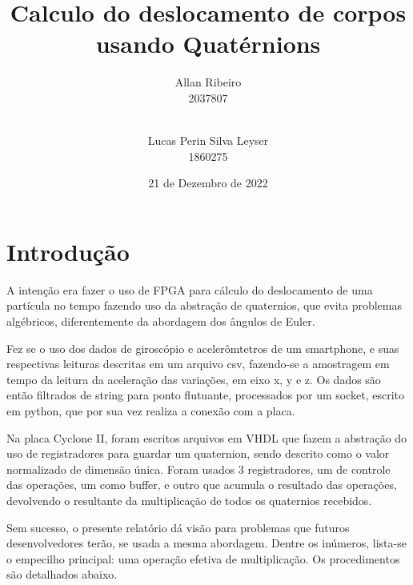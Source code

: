 \documentclass [12pt,oneside] {article}
\begin{document}

\title {Calculo do deslocamento de corpos usando Quatérnions}

\author {
	Allan Ribeiro\\
	2037807\\
	\and\\
	Lucas Perin Silva Leyser\\
	1860275
}

\date {21 de Dezembro de 2022}

\maketitle



\section{Introdução}


	A intenção era fazer o uso de FPGA para cálculo do
deslocamento de uma partícula no tempo fazendo uso da abstração de
quaternios, que evita problemas algébricos, diferentemente da
abordagem dos ângulos de Euler.

	Fez se o uso dos dados de giroscópio e acelerômtetros de um
smartphone, e suas respectivas leituras descritas em um arquivo csv, 
fazendo-se a amostragem em tempo da leitura da aceleração das variações, 
em eixo x, y e z. Os dados são então filtrados de string para ponto flutuante, 
processados por um socket, escrito em python, que por sua vez realiza 
a conexão com a placa.

	Na placa Cyclone II, foram escritos arquivos em VHDL que fazem
a abstração do uso de registradores para guardar um quaternion, sendo
descrito como o valor normalizado de dimensão única. Foram usados 3
registradores, um de controle das operações, um como buffer, e outro que acumula o resultado das operações, devolvendo o resultante da multiplicação de todos os quaternios recebidos.

	Sem sucesso, o presente relatório dá visão para problemas que
futuros desenvolvedores terão, se usada a mesma abordagem. Dentre os
inúmeros, lista-se o empecilho principal: uma operação efetiva de
multiplicação. Os procedimentos são detalhados abaixo.
\end{document}

